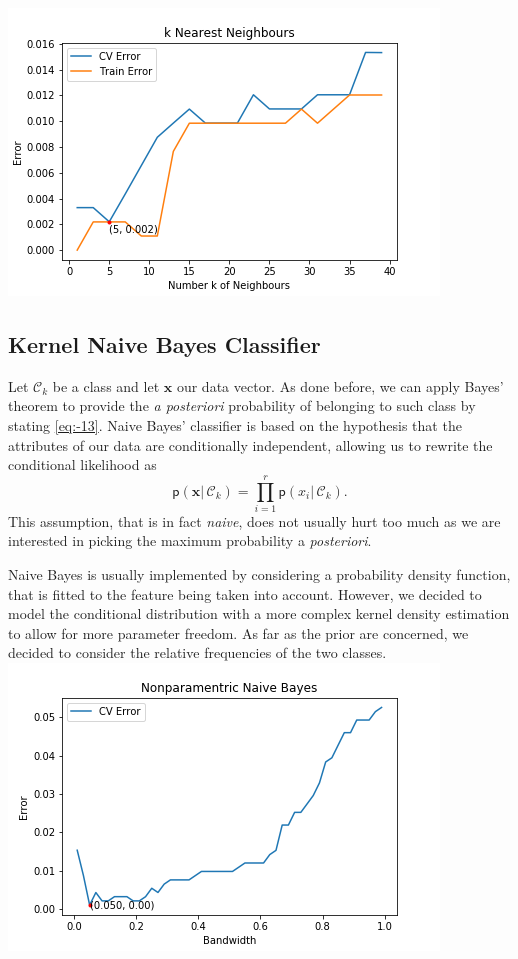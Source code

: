 \documentclass[a4paper]{article}
\begin{document}
\includegraphics{Best K value - K-nearest Neighbours.png}

\subsection{Kernel Naive Bayes Classifier}

Let $\mathcal{C}_{k}$ be a class and let $\mathbf{x}$ our data vector.
As done before, we can apply Bayes' theorem to provide the \textit{a
	posteriori} probability of belonging to such class by stating \ref{eq:-13}.
Naive Bayes' classifier is based on the hypothesis that the attributes
of our data are conditionally independent, allowing us to rewrite
the conditional likelihood as 
\begin{equation}
\mathsf{p}\left(\mathbf{x}|\,\mathcal{C}_{k}\right)=\prod_{i=1}^{r}\mathsf{p}\left(x_{i}|\,\mathcal{C}_{k}\right).\label{eq:-14}
\end{equation}
This assumption, that is in fact \textit{naive}, does not usually
hurt too much as we are interested in picking the maximum probability
a\textit{ posteriori}. 

Naive Bayes is usually implemented by considering a probability density
function, that is fitted to the feature being taken into account.
However, we decided to model the conditional distribution with a more
complex kernel density estimation to allow for more parameter freedom.
As far as the prior are concerned, we decided to consider the relative
frequencies of the two classes.\\

\includegraphics{Best Bandwidth - Naive Bayes.png}
\end{document}
